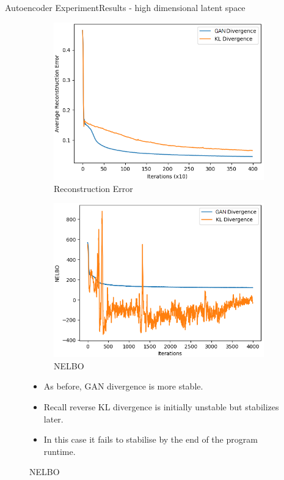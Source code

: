 \documentclass[handout]{beamer}
\begin{document}
\begin{frame}{Autoencoder Experiment}{Results - high dimensional latent space}
\begin{figure}
\begin{subfigure}{0.49\textwidth}
\includegraphics[width=\linewidth]{part4reconerrors/PCADVvsPCKLD.png}
\caption{Reconstruction Error}
\end{subfigure}
\begin{subfigure}{0.49\textwidth}
\includegraphics[width=\linewidth]{part4nelbos/PCADVvsPCKLD.png}
\caption{NELBO}
\end{subfigure}
\begin{itemize}
\item As before, GAN divergence is more stable.
\item Recall reverse KL divergence is initially unstable but stabilizes later.
\item In this case it fails to stabilise by the end of the program runtime.
\end{itemize}
\end{figure}

\end{frame}
\end{document}
